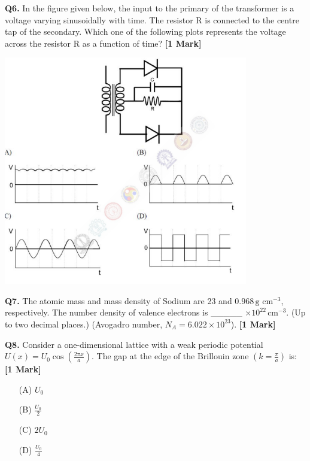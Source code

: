\documentclass[11pt]{article}
\newcommand{\questiona}[2]{
    \noindent\textbf{Q#2.} #1 \hfill \textbf{[1 Mark]}
}
\begin{document}
\questiona{In the figure given below, the input to the primary of the transformer is a voltage varying sinusoidally with time. The resistor R is connected to the centre tap of the secondary. Which one of the following plots represents the voltage across the resistor R as a function of time?}{6}
\begin{center}
\includegraphics[width=0.8\textwidth]{figures/6.png}
\end{center}

\vspace{0.5cm}

\questiona{The atomic mass and mass density of Sodium are 23 and \(0.968 \, \text{g cm}^{-3}\), respectively. The number density of valence electrons is \_\_\_\_\_ \(\times 10^{22} \, \text{cm}^{-3}\). (Up to two decimal places.) (Avogadro number, \(N_A = 6.022 \times 10^{23}\)).}{7}
\vspace{0.5cm}

\questiona{Consider a one-dimensional lattice with a weak periodic potential \( U(x) = U_0 \cos \left( \frac{2\pi x}{a} \right) \). The gap at the edge of the Brillouin zone \( \left( k = \frac{\pi}{a} \right) \) is:}{8}
\begin{enumerate}
    \item[(A)] \( U_0 \)
    \item[(B)] \(\frac{U_0}{2}\)
    \item[(C)] \( 2U_0 \)
    \item[(D)] \(\frac{U_0}{4}\)
\end{enumerate}
\vspace{0.5cm}
\end{document}
